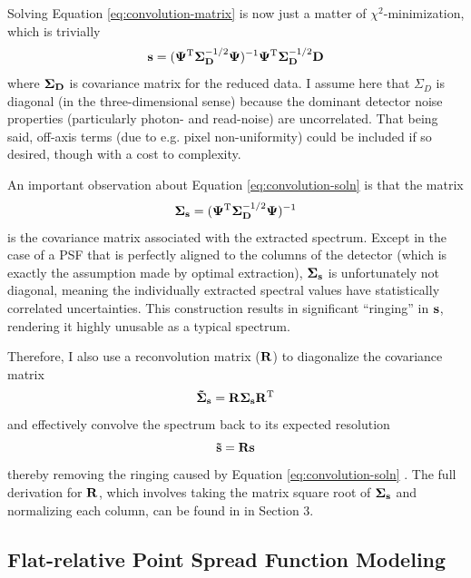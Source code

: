 Solving Equation \ref{eq:convolution-matrix} is now just a matter of $\chi^2$-minimization, which is trivially
\begin{equation}
    \vb{s} = (\vb{\Psi}^\mathrm{T} \vb{\Sigma}_{\vb{D}}^{-1/2} \vb{\Psi})^{-1} \vb{\Psi}^\mathrm{T} \vb{\Sigma}_{\vb{D}}^{-1/2} \vb{D}
    \label{eq:convolution-soln}
\end{equation}
where $\vb{\Sigma_D}$ is covariance matrix for the reduced data. I assume here that $\Sigma_D$ is diagonal (in the three-dimensional sense) because the dominant detector noise properties (particularly photon- and read-noise) are uncorrelated. That being said, off-axis terms (due to e.g. pixel non-uniformity) could be included if so desired, though with a cost to complexity.

An important observation about Equation \ref{eq:convolution-soln} is that the matrix
\begin{equation}
    \vb{\Sigma_s} = (\vb{\Psi}^\mathrm{T} \vb{\Sigma}_{\vb{D}}^{-1/2} \vb{\Psi})^{-1}
\end{equation}
is the covariance matrix associated with the extracted spectrum. Except in the case of a PSF that is perfectly aligned to the columns of the detector (which is exactly the assumption made by optimal extraction), $\vb{\Sigma_s}$ is unfortunately not diagonal, meaning the individually extracted spectral values have statistically correlated uncertainties. This construction results in significant ``ringing'' in $\vb{s}$, rendering it highly unusable as a typical spectrum.

Therefore, I also use a reconvolution matrix ($\vb{R}$) to diagonalize the covariance matrix
\begin{equation}
    \vb{\Tilde{\Sigma}_s} = \vb{R} \vb{\Sigma_s} \vb{R}^\mathrm{T}
\end{equation}
and effectively convolve the spectrum back to its expected resolution
\begin{equation}
    \vb{\Tilde{s}} = \vb{R} \vb{s}
\end{equation}
thereby removing the ringing caused by Equation \ref{eq:convolution-soln} \citep{bolton_spectro-perfectionism_2009}. The full derivation for $\vb{R}$, which involves taking the matrix square root of $\vb{\Sigma_s}$ and normalizing each column, can be found in \citet{bolton_spectro-perfectionism_2009} in Section 3.

\subsection{Flat-relative Point Spread Function Modeling} \label{pipeline2:spec-perf:psf}

